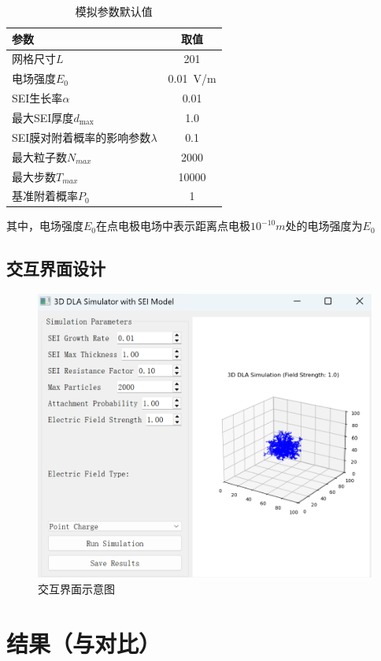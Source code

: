 \documentclass{article}
\begin{document}
\begin{table}[H]
\centering
\caption{模拟参数默认值}
\begin{tabular}{lc}
\toprule
\textbf{参数} & \textbf{取值} \\
\midrule
网格尺寸$L$ & 201 \\
电场强度$E_0$ & \SI{0.01}{V/m} \\
SEI生长率$\alpha$ & 0.01 \\
最大SEI厚度$d_{\text{max}}$ & 1.0 \\
SEI膜对附着概率的影响参数$\lambda$ &0.1\\
最大粒子数$N_{max}$ & 2000\\
最大步数$T_{max}$ & 10000\\
基准附着概率$P_0$ & 1\\
\bottomrule
\end{tabular}
\label{tab:params}
\end{table}
其中，电场强度$E_0$在点电极电场中表示距离点电极$10^{-10}\si{m}$处的电场强度为$E_0$
\subsection{交互界面设计}
\begin{figure}[H]
 \centering
 \includegraphics[scale=0.7]{figs/5.png}
\caption{ 交互界面示意图}
\end{figure}

\section{结果（与对比）}
\end{document}
